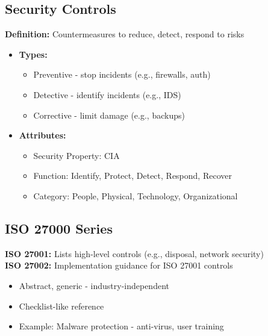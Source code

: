 \subsection{Security Controls}
{
\textbf{Definition:} Countermeasures to reduce, detect, respond to risks
\begin{itemize}[noitemsep]
  \item \textbf{Types:}
    \begin{itemize}[noitemsep]
      \item Preventive - stop incidents (e.g., firewalls, auth)
      \item Detective - identify incidents (e.g., IDS)
      \item Corrective - limit damage (e.g., backups)
    \end{itemize}
  \item \textbf{Attributes:}
    \begin{itemize}[noitemsep]
      \item Security Property: CIA
      \item Function: Identify, Protect, Detect, Respond, Recover
      \item Category: People, Physical, Technology, Organizational
    \end{itemize}
\end{itemize}
}
\subsection{ISO 27000 Series}
{
\textbf{ISO 27001:} Lists high-level controls (e.g., disposal, network security) \\
\textbf{ISO 27002:} Implementation guidance for ISO 27001 controls
\begin{itemize}[noitemsep]
  \item Abstract, generic - industry-independent
  \item Checklist-like reference
  \item Example: Malware protection - anti-virus, user training
\end{itemize}
}

